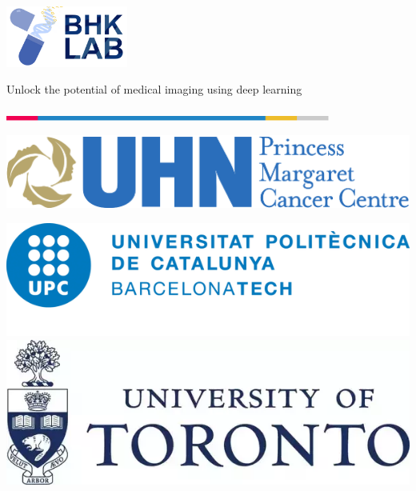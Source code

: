 \documentclass[xcolor={x11names, table, dvipsnames}, compress]{beamer}
\begin{document}
{
    \begin{frame}
        \begin{flushright}
            \hfill\includegraphics[width=0.3\textwidth]{images_presentation/logo}
        \end{flushright}
        \begin{flushleft}
            \begin{flushleft}
                \huge \color{BHKpresentationDark} 
                Unlock the potential of medical imaging using deep learning 
            \end{flushleft}

            \hspace{-1cm}\includegraphics[width=0.8\textwidth]{images_presentation/title_line}\hfill
            
            \date{$~~$}
            \vspace{-1cm}
            \author[Joan]{\begin{flushleft}\vspace{-1cm} Joan Marcè i Igual\end{flushleft}}
            \titlepage
        \end{flushleft}
        
        \begin{flushright}
            \vspace{-3cm}
            \includegraphics[width=.35\textwidth]{images_presentation/pmcp-logo} 

            \vspace{0.5cm}
            \includegraphics[width=.35\textwidth]{images_presentation/upc-logo} \hspace{1cm}
            \includegraphics[width=.35\textwidth]{images_presentation/uoft-logo}
        \end{flushright}
    \end{frame}
}
\end{document}

